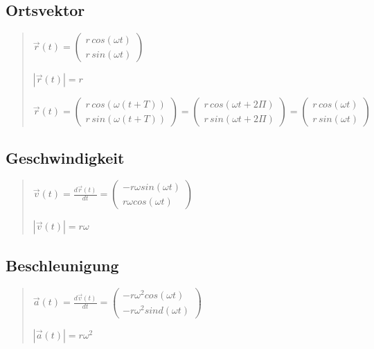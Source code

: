 \subsection*{Ortsvektor}
\begin{verse}
$\vec{r}(t)=\left(\begin{array}{c}
r\, cos(\omega t)\\
r\, sin(\omega t)
\end{array}\right)$

$|\vec{r}(t)|=r$

$\vec{r}(t)=\left(\begin{array}{c}
r\, cos(\omega(t+T))\\
r\, sin(\omega(t+T))
\end{array}\right)=\left(\begin{array}{c}
r\, cos(\omega t+2\Pi)\\
r\, sin(\omega t+2\Pi)
\end{array}\right)=\left(\begin{array}{c}
r\, cos(\omega t)\\
r\, sin(\omega t)
\end{array}\right)$
\end{verse}

\subsection*{Geschwindigkeit}
\begin{verse}
$\vec{v}(t)=\frac{d\vec{r}(t)}{dt}=\left(\begin{array}{c}
-r\omega sin(\omega t)\\
r\omega cos(\omega t)
\end{array}\right)$

$|\vec{v}(t)|=r\omega$
\end{verse}

\subsection*{Beschleunigung}
\begin{verse}
$\vec{a}(t)=\frac{d\vec{v}(t)}{dt}=\left(\begin{array}{c}
-r\omega^{2}cos(\omega t)\\
-r\omega^{2}sind(\omega t)
\end{array}\right)$

$|\vec{a}(t)|=r\omega^{2}$\end{verse}


